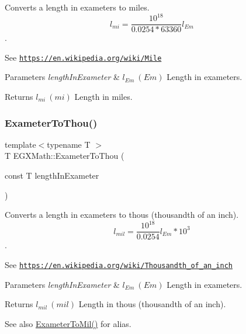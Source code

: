 Converts a length in exameters to miles. \[ l_{mi}=\frac{10^{18}}{0.0254 * 63360} l_{Em} \]. 

See \href{https://en.wikipedia.org/wiki/Mile}{\tt https\+://en.\+wikipedia.\+org/wiki/\+Mile} 
\begin{DoxyParams}{Parameters}
{\em length\+In\+Exameter} & $ l_{Em}\ (Em)$ Length in exameters. \\
\hline
\end{DoxyParams}
\begin{DoxyReturn}{Returns}
$ l_{mi}\ (mi)$ Length in miles. 
\end{DoxyReturn}
\mbox{\label{group___e_g_x_math-_conversions-_length_conversions-_s_i-_exameter-_imperial_gafee1930a425fcae4f9a3d8631aa62b05}} 
\subsubsection{\texorpdfstring{Exameter\+To\+Thou()}{ExameterToThou()}}
{\footnotesize\ttfamily template$<$typename T $>$ \\
T E\+G\+X\+Math\+::\+Exameter\+To\+Thou (\begin{DoxyParamCaption}\item[{const T}]{length\+In\+Exameter }\end{DoxyParamCaption})}



Converts a length in exameters to thous (thousandth of an inch). \[ l_{mil}= \frac{10^{18}}{0.0254} l_{Em} * 10^{3} \]. 

See \href{https://en.wikipedia.org/wiki/Thousandth_of_an_inch}{\tt https\+://en.\+wikipedia.\+org/wiki/\+Thousandth\+\_\+of\+\_\+an\+\_\+inch} 
\begin{DoxyParams}{Parameters}
{\em length\+In\+Exameter} & $ l_{Em}\ (Em)$ Length in exameters. \\
\hline
\end{DoxyParams}
\begin{DoxyReturn}{Returns}
$ l_{mil}\ (mil)$ Length in thous (thousandth of an inch). 
\end{DoxyReturn}
\begin{DoxySeeAlso}{See also}
\mbox{\hyperlink{group___e_g_x_math-_conversions-_length_conversions-_s_i-_exameter-_imperial_ga863f9f7f7e2826324fec642027c48614}{Exameter\+To\+Mil()}} for alias. 
\end{DoxySeeAlso}
\mbox{\label{group___e_g_x_math-_conversions-_length_conversions-_s_i-_exameter-_imperial_gaaa37d3bd7aa2c3a8756ca2e2830bf8ac}} 
